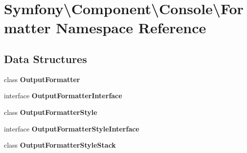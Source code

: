 \section{Symfony\textbackslash{}Component\textbackslash{}Console\textbackslash{}Formatter Namespace Reference}
\label{namespace_symfony_1_1_component_1_1_console_1_1_formatter}
\subsection*{Data Structures}
\begin{DoxyCompactItemize}
\item 
class {\bf Output\+Formatter}
\item 
interface {\bf Output\+Formatter\+Interface}
\item 
class {\bf Output\+Formatter\+Style}
\item 
interface {\bf Output\+Formatter\+Style\+Interface}
\item 
class {\bf Output\+Formatter\+Style\+Stack}
\end{DoxyCompactItemize}
